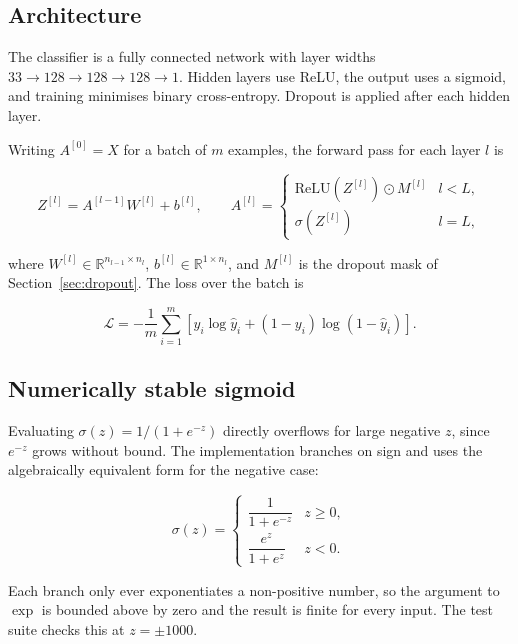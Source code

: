 \documentclass[11pt,a4paper]{article}
\begin{document}
\subsection{Architecture}

The classifier is a fully connected network with layer widths
$33 \rightarrow 128 \rightarrow 128 \rightarrow 128 \rightarrow 1$. Hidden layers
use ReLU, the output uses a sigmoid, and training minimises binary cross-entropy.
Dropout is applied after each hidden layer.

Writing $A^{[0]} = X$ for a batch of $m$ examples, the forward pass for each
layer $l$ is

\begin{equation}
Z^{[l]} = A^{[l-1]} W^{[l]} + b^{[l]},
\qquad
A^{[l]} =
\begin{cases}
\mathrm{ReLU}\!\left(Z^{[l]}\right) \odot M^{[l]} & l < L,\\[0.35em]
\sigma\!\left(Z^{[l]}\right) & l = L,
\end{cases}
\end{equation}

where $W^{[l]} \in \mathbb{R}^{n_{l-1} \times n_l}$, $b^{[l]} \in
\mathbb{R}^{1 \times n_l}$, and $M^{[l]}$ is the dropout mask of
Section~\ref{sec:dropout}. The loss over the batch is

\begin{equation}
\mathcal{L} = -\frac{1}{m}\sum_{i=1}^{m}
\left[ y_i \log \hat{y}_i + (1-y_i)\log(1-\hat{y}_i) \right].
\end{equation}

\subsection{Numerically stable sigmoid}

Evaluating $\sigma(z) = 1/(1+e^{-z})$ directly overflows for large negative $z$,
since $e^{-z}$ grows without bound. The implementation branches on sign and uses
the algebraically equivalent form for the negative case:

\begin{equation}
\sigma(z) =
\begin{cases}
\dfrac{1}{1+e^{-z}} & z \geq 0,\\[0.9em]
\dfrac{e^{z}}{1+e^{z}} & z < 0.
\end{cases}
\end{equation}

Each branch only ever exponentiates a non-positive number, so the argument to
$\exp$ is bounded above by zero and the result is finite for every input. The
test suite checks this at $z = \pm 1000$.
\end{document}
